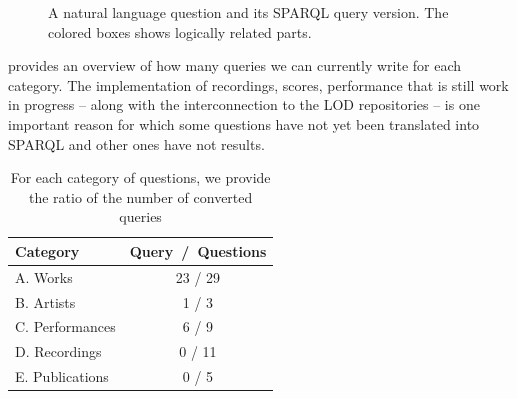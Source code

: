 \begin{figure}
 \centerline{ }
  \smallskip
 \centerline{ }
 \caption{A natural language question and its SPARQL query version. The colored boxes shows logically related parts.}
 \label{fig:sparql-question}
 
\end{figure}

 provides an overview of how many queries we can currently write for each category. The implementation of recordings, scores, performance that is still work in progress -- along with the interconnection to the LOD repositories -- is one important reason for which some questions have not yet been translated into SPARQL and other ones have not results. 

\begin{table}
 \begin{center}
 \begin{tabular}{|l|c|}
  \hline
  Category & Query~/~Questions \\
  \hline
  A. Works & 23 / 29 \\
  \hline
  B. Artists & 1 / 3 \\
  \hline
  C. Performances & 6 / 9 \\
  \hline
  D. Recordings & 0 / 11 \\
  \hline
  E. Publications & 0 / 5 \\
  \hline
 \end{tabular}
\end{center}
 \caption{For each category of questions, we provide the ratio of the number of converted queries}
 \label{tab:queries}
\end{table}

